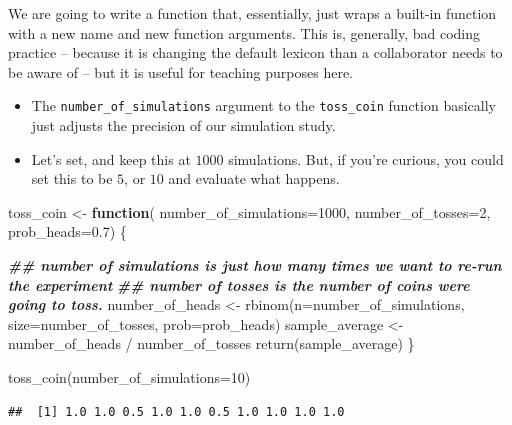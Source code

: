 \documentclass[
]{book}
\newenvironment{Shaded}{\begin{snugshade}}{\end{snugshade}}
\newcommand{\AttributeTok}[1]{\textcolor[rgb]{0.77,0.63,0.00}{#1}}
\newcommand{\ControlFlowTok}[1]{\textcolor[rgb]{0.13,0.29,0.53}{\textbf{#1}}}
\newcommand{\DecValTok}[1]{\textcolor[rgb]{0.00,0.00,0.81}{#1}}
\newcommand{\DocumentationTok}[1]{\textcolor[rgb]{0.56,0.35,0.01}{\textbf{\textit{#1}}}}
\newcommand{\FloatTok}[1]{\textcolor[rgb]{0.00,0.00,0.81}{#1}}
\newcommand{\FunctionTok}[1]{\textcolor[rgb]{0.00,0.00,0.00}{#1}}
\newcommand{\NormalTok}[1]{#1}
\newcommand{\OtherTok}[1]{\textcolor[rgb]{0.56,0.35,0.01}{#1}}
\newcommand{\SpecialCharTok}[1]{\textcolor[rgb]{0.00,0.00,0.00}{#1}}
\providecommand{\tightlist}{%
  \setlength{\itemsep}{0pt}\setlength{\parskip}{0pt}}
\theoremstyle{definition}
\theoremstyle{definition}
\theoremstyle{definition}
\theoremstyle{definition}
\theoremstyle{remark}
\begin{document}
We are going to write a function that, essentially, just wraps a built-in function with a new name and new function arguments. This is, generally, bad coding practice -- because it is changing the default lexicon than a collaborator needs to be aware of -- but it is useful for teaching purposes here.

\begin{itemize}
\tightlist
\item
  The \texttt{number\_of\_simulations} argument to the \texttt{toss\_coin} function basically just adjusts the precision of our simulation study.
\item
  Let's set, and keep this at \(1000\) simulations. But, if you're curious, you could set this to be \(5\), or \(10\) and evaluate what happens.
\end{itemize}

\begin{Shaded}
\begin{Highlighting}[]
\NormalTok{toss\_coin }\OtherTok{\textless{}{-}} \ControlFlowTok{function}\NormalTok{(}
    \AttributeTok{number\_of\_simulations=}\DecValTok{1000}\NormalTok{, }
    \AttributeTok{number\_of\_tosses=}\DecValTok{2}\NormalTok{, }
    \AttributeTok{prob\_heads=}\FloatTok{0.7}\NormalTok{) \{ }
  
  \DocumentationTok{\#\# number of simulations is just how many times we want to re{-}run the experiment}
  \DocumentationTok{\#\# number of tosses is the number of coins we\textquotesingle{}re going to toss.}
\NormalTok{  number\_of\_heads }\OtherTok{\textless{}{-}} \FunctionTok{rbinom}\NormalTok{(}\AttributeTok{n=}\NormalTok{number\_of\_simulations, }\AttributeTok{size=}\NormalTok{number\_of\_tosses, }\AttributeTok{prob=}\NormalTok{prob\_heads)}
\NormalTok{  sample\_average  }\OtherTok{\textless{}{-}}\NormalTok{ number\_of\_heads }\SpecialCharTok{/}\NormalTok{ number\_of\_tosses}
  \FunctionTok{return}\NormalTok{(sample\_average)}
\NormalTok{\}}

\FunctionTok{toss\_coin}\NormalTok{(}\AttributeTok{number\_of\_simulations=}\DecValTok{10}\NormalTok{)}
\end{Highlighting}
\end{Shaded}

\begin{verbatim}
##  [1] 1.0 1.0 0.5 1.0 1.0 0.5 1.0 1.0 1.0 1.0
\end{verbatim}
\end{document}
